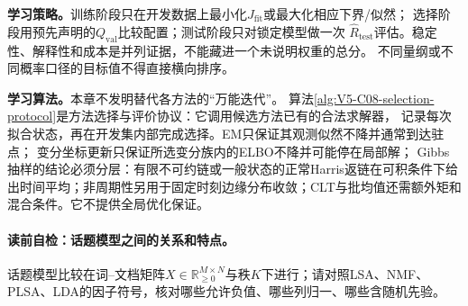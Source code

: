 \label{struct:V5-C08-CH09}
\textbf{学习策略。}训练阶段只在开发数据上最小化$J_{\mathrm{fit}}$或最大化相应下界/似然；
选择阶段用预先声明的$Q_{\mathrm{val}}$比较配置；测试阶段只对锁定模型做一次
$\widehat R_{\mathrm{test}}$评估。稳定性、解释性和成本是并列证据，不能藏进一个未说明权重的总分。
不同量纲或不同概率口径的目标值不得直接横向排序。

\label{struct:V5-C08-CH10}
\textbf{学习算法。}本章不发明替代各方法的“万能迭代”。
算法\ref{alg:V5-C08-selection-protocol}是方法选择与评价协议：它调用候选方法已有的合法求解器，
记录每次拟合状态，再在开发集内部完成选择。EM只保证其观测似然不降并通常到达驻点；
变分坐标更新只保证所选变分族内的ELBO不降并可能停在局部解；
Gibbs抽样的结论必须分层：有限不可约链或一般状态的正常Harris返链在可积条件下给出时间平均；非周期性另用于固定时刻边缘分布收敛；CLT与批均值还需额外矩和混合条件。它不提供全局优化保证。

\paragraph{读前自检：话题模型之间的关系和特点。}话题模型比较在词--文档矩阵$X\in\mathbb R_{\ge0}^{M\times N}$与秩$K$下进行；请对照LSA、NMF、PLSA、LDA的因子符号，核对哪些允许负值、哪些列归一、哪些含随机先验。\par


